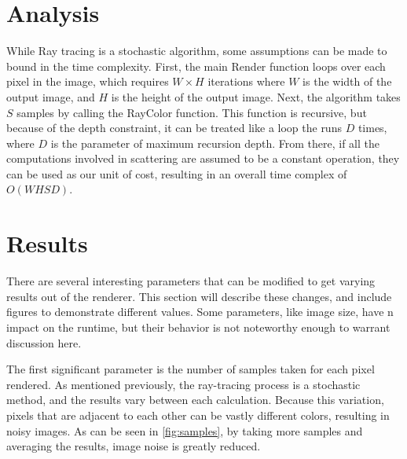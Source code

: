 \documentclass[10pt]{IEEEtran}
\begin{document}
\section*{Analysis}

While Ray tracing is a stochastic algorithm, some assumptions can be made to bound in the time
complexity. First, the main Render function loops over each pixel in the image, which requires
$W\times H$ iterations where $W$ is the width of the output image, and $H$ is the height of the
output image. Next, the algorithm takes $S$ samples by calling the RayColor function. This function
is recursive, but because of the depth constraint, it can be treated like a loop the runs $D$ times,
where $D$ is the parameter of maximum recursion depth. From there, if all the computations involved
in scattering are assumed to be a constant operation, they can be used as our unit of cost,
resulting in an overall time complex of $O(WHSD)$.

\section*{Results}

There are several interesting parameters that can be modified to get varying results out of the
renderer. This section will describe these changes, and include figures to demonstrate different
values. Some parameters, like image size, have n impact on the runtime, but their behavior is not
noteworthy enough to warrant discussion here.

The first significant parameter is the number of samples taken for each pixel rendered. As mentioned
previously, the ray-tracing process is a stochastic method, and the results vary between each
calculation. Because this variation, pixels that are adjacent to each other can be vastly different
colors, resulting in noisy images. As can be seen in \cref{fig:samples}, by taking more samples and
averaging the results, image noise is greatly reduced.
\end{document}
